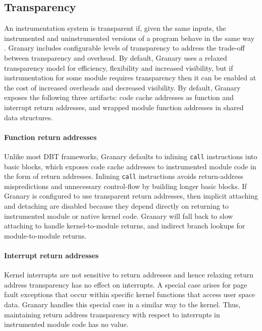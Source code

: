 \documentclass[preprint]{sigplanconf}
\begin{document}
\subsection{Transparency}\label{sec:transparency}

An instrumentation system is transparent if, given the same inputs, the instrumented and uninstrumented versions of a program behave in the same way \cite{Transparency}. Granary includes configurable levels of transparency to address the trade-off between transparency and overhead. By default, Granary uses a relaxed transparency model for efficiency, flexibility and increased visibility, but if instrumentation for some module requires transparency then it can be enabled at the cost of increased overheads and decreased visibility. By default, Granary exposes the following three artifacts: code cache addresses as function and interrupt return addresses, and wrapped module function addresses in shared data structures.

\vspace{-3pt}\paragraph{Function return addresses}\label{para:return_address_transparency} Unlike most DBT frameworks, Granary defaults to inlining \texttt{call} instructions into basic blocks, which exposes code cache addresses to instrumented module code in the form of return addresses. Inlining \texttt{call} instructions avoids return-address mispredictions and unnecessary control-flow by building longer basic blocks. If Granary is configured to use transparent return addresses, then implicit attaching and detaching are disabled because they depend directly on returning to instrumented module or native kernel code. Granary will fall back to slow attaching to handle kernel-to-module returns, and indirect branch lookups for module-to-module returns.

\vspace{-3pt}\paragraph{Interrupt return addresses} Kernel interrupts are not sensitive to return addresses and hence relaxing return address transparency has no effect on interrupts. A special case arises for page fault exceptions that occur within specific kernel functions that access user space data. Granary handles this special case in a similar way to the kernel. Thus, maintaining return address transparency with respect to interrupts in instrumented module code has no value.
\end{document}
